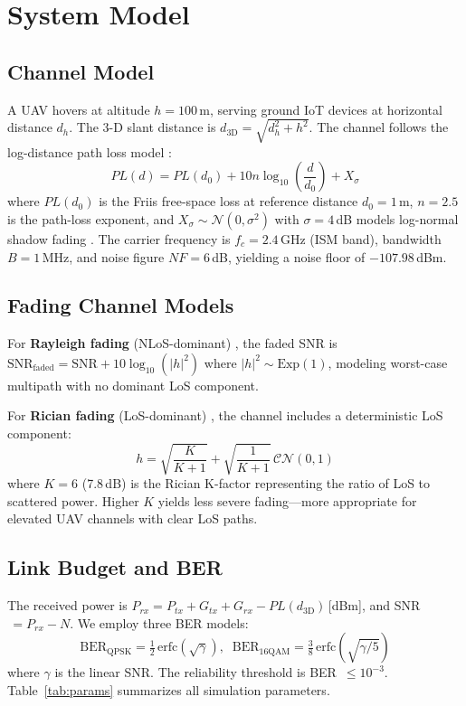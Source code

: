 \documentclass[conference]{IEEEtran}
\begin{document}
\section{System Model}

\subsection{Channel Model}
A UAV hovers at altitude $h=100$\,m, serving ground IoT devices at horizontal distance $d_h$. The 3-D slant distance is $d_\text{3D} = \sqrt{d_h^2 + h^2}$. The channel follows the log-distance path loss model \cite{b5}:
\begin{equation}
PL(d) = PL(d_0) + 10n\log_{10}\!\left(\frac{d}{d_0}\right) + X_\sigma
\label{eq:pathloss}
\end{equation}
where $PL(d_0)$ is the Friis free-space loss at reference distance $d_0=1$\,m, $n=2.5$ is the path-loss exponent, and $X_\sigma\!\sim\!\mathcal{N}(0,\sigma^2)$ with $\sigma=4$\,dB models log-normal shadow fading \cite{b6}. The carrier frequency is $f_c=2.4$\,GHz (ISM band), bandwidth $B=1$\,MHz, and noise figure $NF=6$\,dB, yielding a noise floor of $-107.98$\,dBm.

\subsection{Fading Channel Models}
For \textbf{Rayleigh fading} (NLoS-dominant) \cite{b10}, the faded SNR is $\text{SNR}_\text{faded} = \text{SNR} + 10\log_{10}(|h|^2)$ where $|h|^2\!\sim\!\text{Exp}(1)$, modeling worst-case multipath with no dominant LoS component.

For \textbf{Rician fading} (LoS-dominant) \cite{b11}, the channel includes a deterministic LoS component:
\begin{equation}
h = \sqrt{\frac{K}{K+1}} + \sqrt{\frac{1}{K+1}}\,\mathcal{CN}(0,1)
\label{eq:rician}
\end{equation}
where $K=6$ (7.8\,dB) is the Rician K-factor representing the ratio of LoS to scattered power. Higher $K$ yields less severe fading---more appropriate for elevated UAV channels with clear LoS paths.

\subsection{Link Budget and BER}
The received power is $P_{rx} = P_{tx} + G_{tx} + G_{rx} - PL(d_\text{3D})$\,[dBm], and SNR$\,= P_{rx} - N$. We employ three BER models:
\begin{equation}
\text{BER}_\text{QPSK} = \tfrac{1}{2}\,\text{erfc}(\sqrt{\gamma}), \;\;
\text{BER}_\text{16QAM} = \tfrac{3}{8}\,\text{erfc}\!\left(\sqrt{\gamma/5}\right)
\end{equation}
where $\gamma$ is the linear SNR. The reliability threshold is BER~$\leq10^{-3}$. Table~\ref{tab:params} summarizes all simulation parameters.
\end{document}
